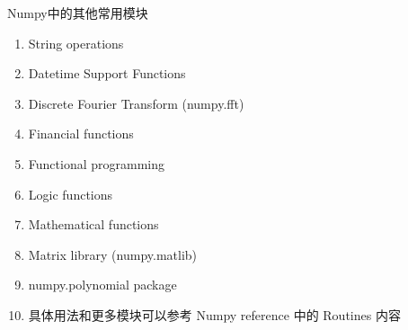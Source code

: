 \documentclass[ignorenonframetext,11pt,xcolor=dvipsnames,hyperref={colorlinks,allcolors=.,urlcolor=blue, citecolor=violet, bookmarksdepth=4},aspectratio=1610]{beamer}
\providecommand{\tightlist}{%
  \setlength{\itemsep}{0pt}\setlength{\parskip}{0pt}}
\begin{document}
\begin{frame}{Numpy中的其他常用模块}
\protect\hypertarget{numpy-2}{}

\begin{enumerate}
\tightlist
\item
  String operations
\item
  Datetime Support Functions
\item
  Discrete Fourier Transform (numpy.fft)
\item
  Financial functions
\item
  Functional programming
\item
  Logic functions
\item
  Mathematical functions
\item
  Matrix library (numpy.matlib)
\item
  numpy.polynomial package
\item
  具体用法和更多模块可以参考 Numpy reference 中的 Routines 内容
\end{enumerate}

\end{frame}
\end{document}
